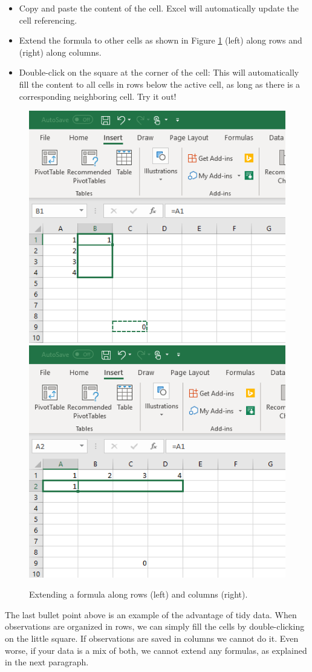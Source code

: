 \documentclass[]{book}
\providecommand{\tightlist}{%
  \setlength{\itemsep}{0pt}\setlength{\parskip}{0pt}}
\begin{document}
\begin{itemize}
\tightlist
\item
  Copy and paste the content of the cell. Excel will automatically update the cell referencing.
\item
  Extend the formula to other cells as shown in Figure \ref{fig:ex16} (left) along rows and (right) along columns.
\item
  Double-click on the square at the corner of the cell: This will automatically fill the content to all cells in rows below the active cell, as long as there is a corresponding neighboring cell. Try it out!
\end{itemize}

\begin{figure}

{\centering \includegraphics[width=0.5\linewidth]{_resources/chapter_excelbasic/exta} \includegraphics[width=0.5\linewidth]{_resources/chapter_excelbasic/extb} 

}

\caption{Extending a formula along rows (left) and columns (right).}\label{fig:ex16}
\end{figure}

The last bullet point above is an example of the advantage of tidy data. When observations are organized in rows, we can simply fill the cells by double-clicking on the little square. If observations are saved in columns we cannot do it. Even worse, if your data is a mix of both, we cannot extend any formulas, as explained in the next paragraph.
\end{document}
